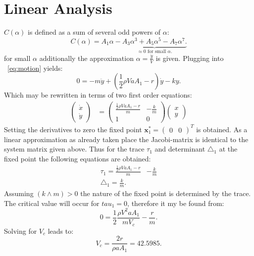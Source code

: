 \section{Linear Analysis}
$C(\alpha)$ is defined as a sum of several odd powers of $\alpha$:
\begin{equation}
C(\alpha) = A_1 \alpha - \underbrace{ A_3 \alpha^3 + A_ 5 \alpha ^5 - A_7 \alpha^7.}_\text{$\approx 0$ for small $\alpha$.} 
\end{equation}
for small $\alpha$ additionally the approximation $\alpha = \frac{\dot{y}}{V}$ is given. Plugging into ~\ref{eq:motion} yields:
\begin{equation}
0 = -m \ddot{y} + (\frac{1}{2}\rho V a A_1 -  r)\dot{y} - ky. 
\end{equation}
Which may be rewritten in terms of two first order equations:
\begin{align}
\begin{pmatrix}
\dot{x} \\ \dot{y} \end{pmatrix} &=
\begin{pmatrix}
	\frac{\frac{1}{2}\rho V a A_1 -  r}{m} & - \frac{k}{m}  \\ 
	1 & 0
\end{pmatrix} 
\begin{pmatrix}
x \\ y
\end{pmatrix}
\end{align}
Setting the derivatives to zero the fixed point $\mathbf{x}_1^* = \begin{pmatrix} 0 & 0 \end{pmatrix}^T$ is obtained. As a linear approximation as already taken place the Jacobi-matrix is identical to the system matrix given above. Thus for the trace $\tau_1$ and determinant $\triangle_1$ at the fixed point the following equations are obtained:
\begin{align}
\tau_1 = \frac{\frac{1}{2}\rho V a A_1 -  r}{m} & - \frac{k}{m} \\
\triangle_1 = \frac{k}{m}.
\end{align}
Assuming $(k \wedge m) > 0$ the nature of the fixed point is determined by the trace. The critical value will occur for $tau_1 = 0$, therefore it my be found from:
\begin{equation}
0 = \frac{1}{2} \frac{\rho V^2 a A_1}{mV_c} - \frac{r}{m}.
\end{equation}
Solving for $V_c$ leads to:
\begin{equation}
V_c = \frac{2r}{\rho a A_1} = 42.5985.
\end{equation}
